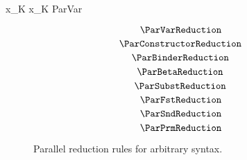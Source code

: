 \Rule{\ParVarReduction}
    {\color{white}{\_}}
    { x_K \parred x_K}
    {ParVar}

\begin{figure}
    \centering
    $$\ParVarReduction$$
    $$\ParConstructorReduction$$
    $$\ParBinderReduction$$
    $$\ParBetaReduction$$
    $$\ParSubstReduction$$
    $$\ParFstReduction$$
    $$\ParSndReduction$$
    $$\ParPrmReduction$$
    \caption{Parallel reduction rules for arbitrary syntax.}
    \label{fig:par-reduction}
\end{figure}
